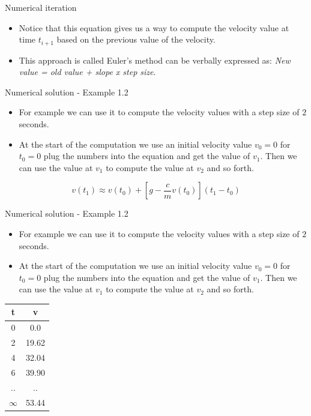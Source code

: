 \documentclass[12pt]{beamer}
\begin{document}
\begin{frame}{Numerical iteration}
\begin{itemize} 
\item{Notice that this equation gives us a way to compute the velocity value
at time $t_{i+1}$ based on the previous value of the velocity.}
\vspace{\baselineskip}
\item{This approach is called Euler's method can be verbally expressed as: 
{\it New value = old value + slope x step size}.}

\end{itemize}
\end{frame}


\begin{frame}{Numerical solution - Example 1.2}
\begin{itemize} 
\item{For example we can
use it to compute the velocity values with a step size of $2$
seconds.}

\item{At the start of the computation we use an initial velocity value
$v_{0} = 0$ for $t_{0} = 0$ plug the numbers into the equation 
and get the value of $v_{1}$. Then we can use the value at $v_{1}$ to 
compute the value at $v_{2}$ and so forth.
}
\end{itemize}

\[
v(t_1) \approx v(t_0)+\left[g-\frac{c}{m}v(t_0)\right](t_1-t_0)
\]

\end{frame}

\begin{frame}{Numerical solution - Example 1.2}
\begin{itemize} 
\item{For example we can
use it to compute the velocity values with a step size of $2$
seconds.}

\item{At the start of the computation we use an initial velocity value
$v_{0} = 0$ for $t_{0} = 0$ plug the numbers into the equation 
and get the value of $v_{1}$. Then we can use the value at $v_{1}$ to 
compute the value at $v_{2}$ and so forth. }
\end{itemize}
\begin{table} 
\begin{tabular}{|c|c|} 
\hline
{\bf t}    & {\bf v} \\ 
\hline 
0   &  0.0 \\ 
2   &  19.62 \\ 
4   &  32.04 \\ 
6   &  39.90  \\
..   &  ..  \\
$\infty$ & 53.44 \\ 
\hline
\end{tabular}
\end{table} 
\end{frame}
\end{document}
